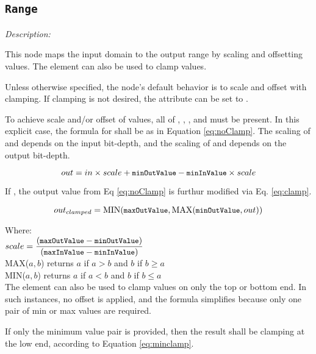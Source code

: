 \subsection{\texttt{Range}}

\emph{Description:} \par
This node maps the input domain to the output range by scaling and offsetting values. The  element can also be used to clamp values.

Unless otherwise specified, the node's default behavior is to scale and offset with clamping. If clamping is not desired, the  attribute can be set to .

To achieve scale and/or offset of values, all of , , , and  must be present. In this explicit case, the formula for  shall be as in Equation \ref{eq:noClamp}. The scaling of  and  depends on the input bit-depth, and the scaling of  and  depends on the output bit-depth.

\begin{equation}\label{eq:noClamp}
	out = in \times scale + {\small \texttt{minOutValue}} - {\small \texttt{minInValue}} \times scale
\end{equation}

If , the output value from Eq \ref{eq:noClamp} is furthur modified via Eq. \ref{eq:clamp}.

\begin{equation}\label{eq:clamp}
	out_{clamped} = \mathrm{MIN}({\small \texttt{maxOutValue}}, \mathrm{MAX}( {\small \texttt{minOutValue}}, out))
\end{equation}

\tabto{0.25in} Where: \\[6pt]
\tabto{0.5in} $scale = \dfrac{({\small \texttt{maxOutValue}} - {\small \texttt{minOutValue}})}{({\small \texttt{maxInValue}} - {\small \texttt{minInValue}})}$ \\[12pt]
\tabto{0.5in} MAX(${a,b}$) returns $a$ if $a > b$ and $b$ if $b \geq a$ \\[6pt]
\tabto{0.5in} MIN(${a,b}$) returns $a$ if $a < b$ and $b$ if $b \leq a$ \\[10pt]

The  element can also be used to clamp values on only the top or bottom end. In such instances, no offset is applied, and the formula simplifies because only one pair of min or max values are required. 

If only the minimum value pair is provided, then the result shall be clamping at the low end, according to Equation \ref{eq:minclamp}.

